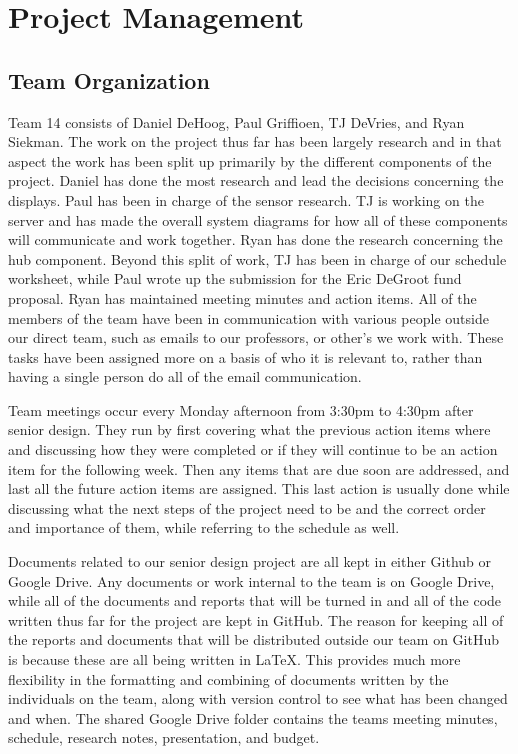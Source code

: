 \documentclass[ppfs.tex]{template/subfiles}
\begin{document}
\section{Project Management}
    \subsection{Team Organization}
	Team 14 consists of Daniel DeHoog, Paul Griffioen, TJ DeVries, and Ryan Siekman. The work on the project thus far has been largely research and in that aspect the work has been split up primarily by the different components of the project. Daniel has done the most research and lead the decisions concerning the displays. Paul has been in charge of the sensor research. TJ is working on the server and has made the overall system diagrams for how all of these components will communicate and work together. Ryan has done the research concerning the hub component. Beyond this split of work, TJ has been in charge of our schedule worksheet, while Paul wrote up the submission for the Eric DeGroot fund proposal. Ryan has maintained meeting minutes and action items. All of the members of the team have been in communication with various people outside our direct team, such as emails to our professors, or other's we work with. These tasks have been assigned more on a basis of who it is relevant to, rather than having a single person do all of the email communication. 

	Team meetings occur every Monday afternoon from 3:30pm to 4:30pm after senior design. They run by first covering what the previous action items where and discussing how they were completed or if they will continue to be an action item for the following week. Then any items that are due soon are addressed, and last all the future action items are assigned. This last action is usually done while discussing what the next steps of the project need to be and the correct order and importance of them, while referring to the schedule as well.

	Documents related to our senior design project are all kept in either Github or Google Drive. Any documents or work internal to the team is on Google Drive, while all of the documents and reports that will be turned in and all of the code written thus far for the project are kept in GitHub. The reason for keeping all of the reports and documents that will be distributed outside our team on GitHub is because these are all being written in \LaTeX. This provides much more flexibility in the formatting and combining of documents written by the individuals on the team, along with version control to see what has been changed and when. The shared Google Drive folder contains the teams meeting minutes, schedule, research notes, presentation, and budget.
	
\end{document}
